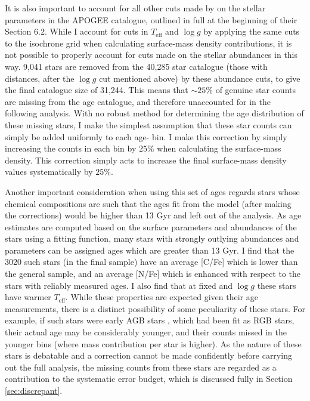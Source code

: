  It is also important to account for all other cuts made by \citet{2016MNRAS.456.3655M} on the stellar parameters in the APOGEE catalogue, outlined in full at the beginning of their Section 6.2. While I account for cuts in $T_{\mathrm{eff}}$ and $\log{g}$ by applying the same cuts to the isochrone grid when calculating surface-mass density contributions, it is not possible to properly account for cuts made on the stellar abundances in this way. 9,041 stars are removed from the 40,285 star catalogue (those with distances, after the $\log{g}$ cut mentioned above) by these abundance cuts, to give the final catalogue size of 31,244. This means that $\sim 25\%$ of genuine star counts are missing from the age catalogue, and therefore unaccounted for in the following analysis. With no robust method for determining the age distribution of these missing stars, I make the simplest assumption that these star counts can simply be added uniformly to each age-\feh{} bin. I make this correction by simply increasing the counts in each bin by $25\%$ when calculating the surface-mass density. This correction simply acts to increase the final surface-mass density values systematically by $25\%$.

Another important consideration when using this set of ages regards stars whose chemical compositions are such that the ages fit from the model (after making the corrections) would be higher than 13 Gyr and left out of the analysis. As age estimates are computed based on the surface parameters and abundances of the stars using a fitting function, many stars with strongly outlying abundances and parameters can be assigned ages which are greater than 13 Gyr. I find that the 3020 such stars (in the final sample) have an average [C/Fe] which is lower than the general sample, and an average [N/Fe] which is enhanced with respect to the stars with reliably measured ages. I also find that at fixed \feh{} and $\log{g}$ these stars have warmer $T_{\mathrm{eff}}$. While these properties are expected given their age measurements, there is a distinct possibility of some peculiarity of these stars. For example, if such stars were early AGB stars \citep[having gone through the second dredge-up, reducing the surface C abundance, e.g.][]{1999ApJ...510..232B}, which had been fit as RGB stars, their actual age may be considerably younger, and their counts missed in the younger bins (where mass contribution per star is higher). As the nature of these stars is debatable and a correction cannot be made confidently before carrying out the full analysis, the missing counts from these stars are regarded as a contribution to the systematic error budget, which is discussed fully in Section \ref{sec:discrepant}.

